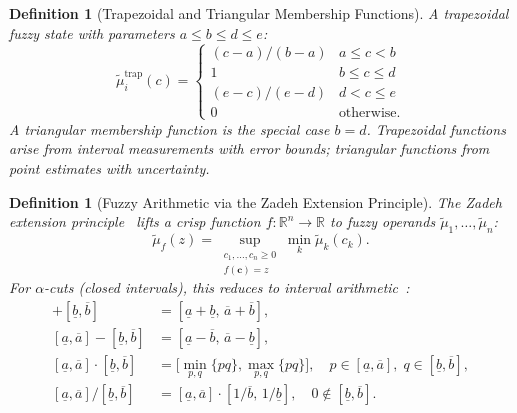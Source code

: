 \documentclass[twocolumn,10pt,a4paper]{article}
\newtheorem{definition}[theorem]{Definition}
\begin{document}
\begin{definition}[Trapezoidal and Triangular Membership Functions]
\label{def:tri-trap}
A \emph{trapezoidal} fuzzy state with parameters $a\leq b\leq d\leq e$:
\begin{equation}
  \tilde{\mu}_i^{\mathrm{trap}}(c) =
  \begin{cases}
    (c-a)/(b-a) & a\leq c < b \\
    1           & b\leq c\leq d \\
    (e-c)/(e-d) & d< c\leq e \\
    0           & \text{otherwise.}
  \end{cases}
  \label{eq:trapezoid}
\end{equation}
A \emph{triangular} membership function is the special case $b=d$.  Trapezoidal
functions arise from interval measurements with error bounds; triangular
functions from point estimates with uncertainty.
\end{definition}

\begin{definition}[Fuzzy Arithmetic via the Zadeh Extension Principle]
\label{def:extension}
The Zadeh extension principle~\cite{Zadeh1965,Zadeh1978} lifts a crisp function
$f:\mathbb{R}^n\to\mathbb{R}$ to fuzzy operands
$\tilde{\mu}_1,\ldots,\tilde{\mu}_n$:
\begin{equation}
  \tilde{\mu}_f(z) = \sup_{\substack{c_1,\ldots,c_n\geq 0\\f(\mathbf{c})=z}}
    \min_{k}\tilde{\mu}_k(c_k).
  \label{eq:extension}
\end{equation}
For $\alpha$-cuts (closed intervals), this reduces to interval
arithmetic~\cite{Zimmermann2001book}:
\begin{align}
  [\underline{a},\overline{a}]+[\underline{b},\overline{b}]
    &=[\underline{a}+\underline{b},\,\overline{a}+\overline{b}], \label{eq:ia-add}\\
  [\underline{a},\overline{a}]-[\underline{b},\overline{b}]
    &=[\underline{a}-\overline{b},\,\overline{a}-\underline{b}], \label{eq:ia-sub}\\
  [\underline{a},\overline{a}]\cdot[\underline{b},\overline{b}]
    &=\bigl[\min_{p,q}\{pq\},\max_{p,q}\{pq\}\bigr],\quad p\in[\underline{a},\overline{a}],\;
      q\in[\underline{b},\overline{b}], \label{eq:ia-mul}\\
  [\underline{a},\overline{a}]/[\underline{b},\overline{b}]
    &=[\underline{a},\overline{a}]\cdot[1/\overline{b},\,1/\underline{b}],
    \quad 0\notin[\underline{b},\overline{b}]. \label{eq:ia-div}
\end{align}
\end{definition}
\end{document}
